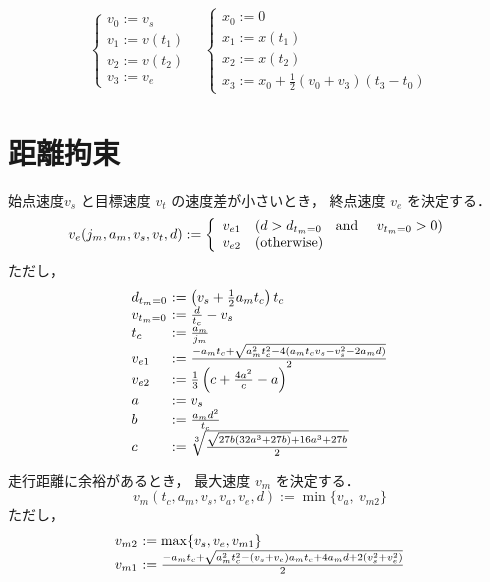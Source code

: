 \documentclass[a5paper]{ltjsarticle}
\begin{document}
$$
    \left\{ \begin{array}{l}
        v_0 := v_s    \\
        v_1 := v(t_1) \\
        v_2 := v(t_2) \\
        v_3 := v_e
    \end{array} \right.
    \quad
    \left\{ \begin{array}{l}
        x_0 := 0      \\
        x_1 := x(t_1) \\
        x_2 := x(t_2) \\
        x_3 := x_0 + \frac{1}{2}(v_0 + v_3)(t_3-t_0)
    \end{array} \right.
$$

\section{距離拘束}
始点速度$v_s$ と目標速度 $v_t$ の速度差が小さいとき，
終点速度 $v_e$ を決定する．
$$
    v_e(j_m, a_m, v_s, v_t, d) :=
    \left\{\begin{array}{ll}
        v_{e1} & (d > d_{t_m=0} \mbox{\quad and \quad} v_{t_m=0} > 0)
        \\
        v_{e2} & (\mbox{otherwise})
    \end{array}\right.
$$
ただし，
$$
    \begin{array}{l@{~}l}
        d_{t_m=0} & := \left( v_s + \frac{1}{2} a_m t_c \right) t_c
        \\
        v_{t_m=0} & := \frac{d}{t_c} - v_s
        \\
        t_c       & := \frac{a_m}{j_m}
        \\
        v_{e1}    & :=
        \frac{-a_m t_c + \sqrt{a_m^2 t_c^2-4(a_m t_c v_s - v_s^2 - 2a_m d)}}{2}
        \\
        v_{e2}    & :=
        \frac{1}{3}\left(c +\frac{4a^2}{c}
        -a
        \right)
        \\
        a         & := v_s
        \\
        b         & :=                       \frac{a_md^2}{t_c}
        \\
        c         & :=                       \sqrt[3]{\frac{\sqrt{27b(32a^3+27b)} + 16a^3+27b}{2}}
    \end{array}
$$

走行距離に余裕があるとき，
最大速度 $v_m$ を決定する．
$$
    v_m(t_c, a_m, v_s, v_a, v_e, d) := \min\{v_a,~v_{m2}\}
$$
ただし，
$$
    \begin{array}{l@{~}l}
        v_{m2} & := \max\{v_s, v_e, v_{m1}\}                                                   \\
        v_{m1} & := \frac{-a_mt_c + \sqrt{a_m^2t_c^2-(v_s+v_e)a_mt_c+4a_md+2(v_s^2+v_e^2)}}{2}
    \end{array}
$$
\end{document}
